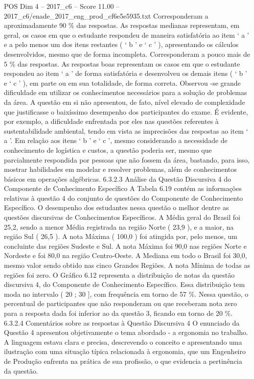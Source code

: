 \begin{textsample}{POS Dim 4 – 2017\_c6 – Score 11.00 – 2017\_c6/enade\_2017\_eng\_prod\_cf6e5e5935.txt}
Corresponderam a aproximadamente 90 \% das respostas.
As respostas medianas representam, em geral, os casos em que o estudante respondeu de maneira satisfatória ao item ‘ a ’ e a pelo menos um dos itens restantes ( ‘ b ’ e ‘ c ’ ), apresentando os cálculos desenvolvidos, mesmo que de forma incompleta.
Corresponderam a pouco mais de 5 \% das respostas.
As respostas boas representam os casos em que o estudante respondeu ao item ‘ a ’ de forma satisfatória e desenvolveu os demais itens ( ‘ b ’ e ‘ c ’ ), em parte ou em sua totalidade, de forma correta.
Observou -se grande dificuldade em utilizar os conhecimentos necessários para a solução de problemas da área.
A questão em si não apresentou, de fato, nível elevado de complexidade que justificasse o baixíssimo desempenho dos participantes do exame.
É evidente, por exemplo, a dificuldade enfrentada por eles nas questões referentes à sustentabilidade ambiental, tendo em vista as imprecisões das respostas ao item ‘ a ’.
Em relação aos itens ‘ b ’ e ‘ c ’, mesmo considerando a necessidade de conhecimento de logística e custos, a questão poderia ser, mesmo que parcialmente respondida por pessoas que não fossem da área, bastando, para isso, mostrar habilidades em modelar e resolver problemas, além de conhecimentos básicos em operações algébricas. 6.3.2.3 Análise da Questão Discursiva 4 do Componente de Conhecimento Específico A Tabela 6.19 contém as informações relativas à questão 4 do conjunto de questões do Componente de Conhecimento Específico.
O desempenho dos estudantes nessa questão o melhor dentre as questões discursivas de Conhecimentos Específicos.
A Média geral do Brasil foi 25,2, sendo a menor Média registrada na região Norte ( 23,9 ), e a maior, na região Sul ( 26,5 ).
A nota Máxima ( 100,0 ) foi atingida por, pelo menos, um concluinte das regiões Sudeste e Sul.
A nota Máxima foi 90,0 nas regiões Norte e Nordeste e foi 80,0 na região Centro-Oeste.
A Mediana em todo o Brasil foi 30,0, mesmo valor sendo obtido nas cinco Grandes Regiões.
A nota Mínima de todas as regiões foi zero.
O Gráfico 6.12 representa a distribuição de notas da questão discursiva 4, do Componente de Conhecimento Específico.
Essa distribuição tem moda no intervalo ( 20 ; 30 ], com frequência em torno de 57 \%.
Nessa questão, o percentual de participantes que não responderam ou que receberam nota zero para a resposta dada foi inferior ao da questão 3, ficando em torno de 20 \%. 6.3.2.4 Comentários sobre as respostas à Questão Discursiva 4 O enunciado da Questão 4 apresentou objetivamente o tema abordado - a ergonomia no trabalho.
A linguagem estava clara e precisa, descrevendo o conceito e apresentando uma ilustração com uma situação típica relacionada à ergonomia, que um Engenheiro de Produção enfrenta na prática de sua profissão, o que evidencia a pertinência da questão.

\end{textsample}
